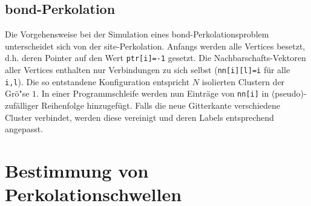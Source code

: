 \subsection{bond-Perkolation}
Die Vorgehensweise bei der Simulation eines bond-Perkolationsproblem unterscheidet sich von der site-Perkolation. Anfangs werden alle Vertices besetzt, d.h. deren Pointer auf den Wert \texttt{ptr[i]=-1} gesetzt. Die Nachbarschafts-Vektoren aller Vertices enthalten nur Verbindungen zu sich selbst (\texttt{nn[i][l]=i} f\"ur alle \texttt{i,l}). Die so entstandene Konfiguration entspricht $N$ isolierten Clustern der Gr\"o"se $1$. In einer Programmschleife werden nun Eintr\"age von \texttt{nn[i]} in (pseudo)-zuf\"alliger Reihenfolge hinzugef\"ugt. Falls die neue Gitterkante verschiedene Cluster verbindet, werden diese vereinigt und deren Labels entsprechend angepasst.


\section{Bestimmung von Perkolationschwellen}
